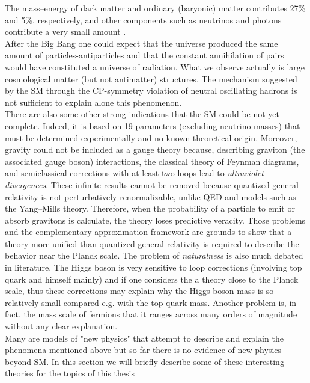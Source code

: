 The mass–energy of dark matter and ordinary (baryonic) matter contributes 27\% and 5\%, respectively, and other components 
such as neutrinos and photons contribute a very small amount \cite{plank}. 
\vspace{\baselineskip}
\\After the Big Bang one could expect that the universe produced the same amount of particles-antiparticles and that the constant annihilation
of pairs would have constituted a universe of radiation. What we observe actually is large cosmological matter (but not antimatter) structures.
The mechanism suggested by the SM through the CP-symmetry violation of neutral oscillating hadrons is not sufficient to explain alone this phenomenon.
\vspace{\baselineskip}
\\There are also some other strong indications that the SM could be not yet complete. Indeed, it is based on 19 parameters (excluding neutrino masses)
that must be determined experimentally and no known theoretical origin.  Moreover, gravity could not be included as a gauge theory because, 
describing graviton (the associated gauge boson) interactions, the classical theory of  Feynman diagrams, and semiclassical corrections with 
at least two loops lead to \textit{ultraviolet divergences}. These infinite results cannot be removed 
because quantized general relativity is not perturbatively renormalizable, unlike QED and models such as the Yang–Mills theory. 
Therefore, when the probability of a particle to emit or absorb gravitons is calculate, the theory loses predictive veracity. 
Those problems and the complementary approximation framework are grounds to show that a theory more unified than quantized general relativity is 
required to describe the behavior near the Planck scale. 
\vspace{\baselineskip}
The problem of \textit{naturalness} is also much debated in literature. The Higgs boson is very sensitive to loop corrections (involving top quark and himself
mainly) and if one considers the a theory close to the Planck scale, thus these corrections may explain why the Higgs boson mass is so relatively small compared
e.g. with the top quark mass. Another problem is, in fact, the mass scale of fermions that it ranges across many orders of magnitude without any clear explanation.\\
Many are models of "new physics" that attempt to describe and explain the phenomena mentioned above but so far there is no evidence of new physics beyond SM. 
In this section we will briefly describe some of these interesting theories for the topics of this thesis

